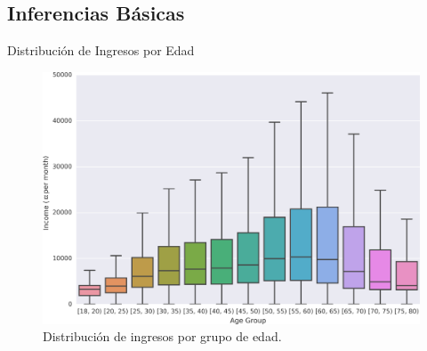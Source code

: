 \documentclass{beamer}
\begin{document}
\subsection{Inferencias Básicas}
\begin{frame}{Distribución de Ingresos por Edad}
	\begin{figure}
		\includegraphics[width=.80\framewidth]{income_age_boxplot4.png}
		\caption{Distribución de ingresos por grupo de edad.}
	\end{figure}
\end{frame}
\end{document}
